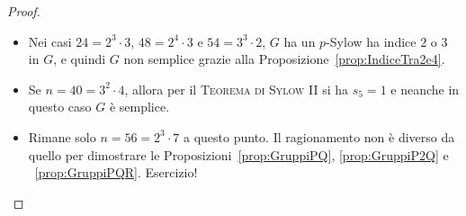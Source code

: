 \begin{proof}
\begin{itemize}
\item Nei casi $24 = 2^3 \cdot 3$, $48 = 2^4 \cdot 3$ e $54 = 3^3 \cdot 2$, $G$ ha un $p$-Sylow ha indice $2$ o $3$ in $G$, e quindi $G$ non semplice grazie alla Proposizione~\ref{prop:IndiceTra2e4}.
\item Se $n= 40 = 3^2 \cdot 4$, allora per il {\scshape Teorema di Sylow II} si ha $s_5=1$ e neanche in questo caso $G$ è semplice.
\item Rimane solo $n = 56 = 2^3 \cdot 7$ a questo punto. Il ragionamento non è diverso da quello per dimostrare le Proposizioni~\ref{prop:GruppiPQ}, \ref{prop:GruppiP2Q} e ~\ref{prop:GruppiPQR}. Esercizio! \qedhere
\end{itemize}
\end{proof}

%
